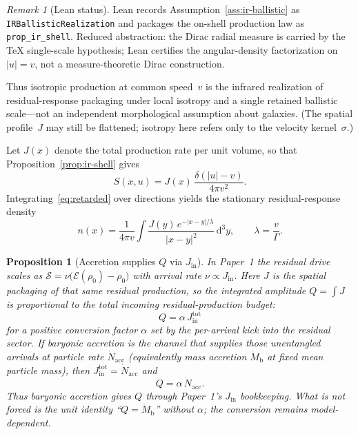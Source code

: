 \documentclass[11pt]{article}
\newtheorem{proposition}[theorem]{Proposition}
\theoremstyle{definition}
\theoremstyle{remark}
\newtheorem{remark}[theorem]{Remark}
\newcommand{\dd}{\mathrm{d}}
\newcommand{\Mb}{M_{\mathrm{b}}}
\begin{document}
\begin{remark}[Lean status]
\label{rem:ir-shell-lean}
Lean records Assumption~\ref{ass:ir-ballistic} as \texttt{IRBallisticRealization} and packages the on-shell production law as \texttt{prop\_ir\_shell}.
Reduced abstraction: the Dirac radial measure is carried by the TeX single-scale hypothesis; Lean certifies the angular-density factorization on $|u|=v$, not a measure-theoretic Dirac construction.
\end{remark}

\noindent
Thus isotropic production at common speed~$v$ is the infrared realization of residual-response packaging under local isotropy and a single retained ballistic scale---not an independent morphological assumption about galaxies.
(The spatial profile~$J$ may still be flattened; isotropy here refers only to the velocity kernel~$\sigma$.)

Let $J(x)$ denote the total production rate per unit volume, so that Proposition~\ref{prop:ir-shell} gives
\begin{equation}
  S(x,u)=J(x)\,\frac{\delta(|u|-v)}{4\pi v^{2}}.
\end{equation}
Integrating~\eqref{eq:retarded} over directions yields the stationary residual-response density
\begin{equation}
  n(x)=\frac{1}{4\pi v}\int\frac{J(y)\,e^{-|x-y|/\lambda}}{|x-y|^{2}}\,\dd^{3}y,
  \qquad\lambda=\frac{v}{\Gamma}.
  \label{eq:kernel}
\end{equation}
\begin{proposition}[Accretion supplies $Q$ via $J_{\mathrm{in}}$]
\label{prop:accretion-Q}
In Paper~1 the residual drive scales as $\mathcal S=\nu\bigl(\mathcal E(\rho_0)-\rho_0\bigr)$ with arrival rate $\nu\propto J_{\mathrm{in}}$.
Here $J$ is the spatial packaging of that same residual production, so the integrated amplitude
$Q=\int J$ is proportional to the total incoming residual-production budget:
\begin{equation}
  Q=\alpha\,J_{\mathrm{in}}^{\mathrm{tot}}
\end{equation}
for a positive conversion factor $\alpha$ set by the per-arrival kick into the residual sector.
If baryonic accretion is the channel that supplies those unentangled arrivals at particle rate $\dot N_{\mathrm{acc}}$ (equivalently mass accretion $\dot\Mb$ at fixed mean particle mass), then $J_{\mathrm{in}}^{\mathrm{tot}}=\dot N_{\mathrm{acc}}$ and
\begin{equation}
  Q=\alpha\,\dot N_{\mathrm{acc}}.
\end{equation}
Thus baryonic accretion \emph{gives} $Q$ through Paper~1's $J_{\mathrm{in}}$ bookkeeping.
What is not forced is the unit identity ``$Q=\dot\Mb$'' without $\alpha$; the conversion remains model-dependent.
\end{proposition}
\end{document}
